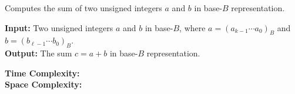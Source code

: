 \begin{Func}
    Computes the sum of two unsigned integers $a$ and $b$ in base-$B$ representation.

    \vspace{.5em}
    \noindent
    \textbf{Input: } Two unsigned integers $a$ and $b$ in base-$B$, where $a = (a_{k-1}\cdots a_0)_B$ and $b = (b_{\ell-1}\cdots b_0)_B$.\\
    \textbf{Output: } The sum $c = a + b$ in base-$B$ representation.\\
    \begin{algorithm}[H]
        \SetAlgoLined
        
        \vspace{.5em}
    \end{algorithm}

    \noindent
    \textbf{Time Complexity: }\\

    \noindent
    \textbf{Space Complexity: }
\end{Func}
